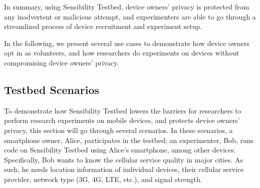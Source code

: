 \smallskip
In summary, 
%
%
using Sensibility Testbed, device owners' privacy is protected
from any inadvertent or malicious attempt, and experimenters 
are able to go through a streamlined process of device 
recruitment and experiment setup.

In the following, we present several use cases to
demonstrate how device owners opt in as volunteers, and how
researchers do experiments on devices without compromising device
owners' privacy.

\subsection{Testbed Scenarios}\label{sec-scenario}
To demonstrate how Sensibility Testbed lowers the barriers for
researchers to perform research experiments on mobile devices,
and protects device owners' privacy, this section will go
through several scenarios. In these scenarios, a smartphone owner, Alice,
participates in the testbed; an experimenter, Bob, runs code on
Sensibility Testbed using Alice's smartphone, among other
devices. Specifically, Bob wants to know the cellular service
quality in major cities. As such, he needs location information
of individual devices, their cellular service provider, network
type (3G, 4G, LTE, etc.), and signal strength.

